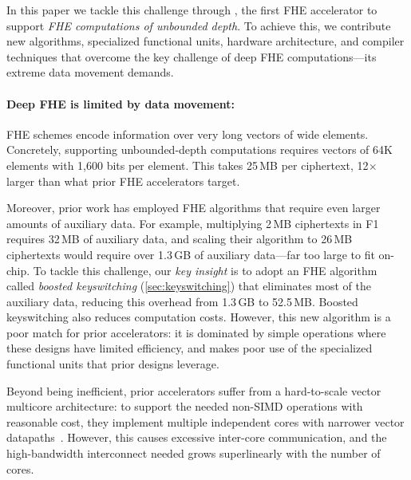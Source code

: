 In this paper we tackle this challenge through \name, the first FHE accelerator
to support \emph{FHE computations of unbounded depth}. To achieve this, we
contribute new algorithms, specialized functional units, hardware architecture,
and compiler techniques that overcome the key challenge of deep FHE
computations---its extreme data movement demands.

\paragraph{Deep FHE is limited by data movement:}
FHE schemes encode information over very long vectors of wide elements.
Concretely, supporting unbounded-depth computations requires vectors of 64K
elements with 1,600 bits per element. This takes 25\,MB per ciphertext,
12$\times$ larger than what prior FHE accelerators target.

Moreover, prior work has employed FHE algorithms that require even larger
amounts of auxiliary data. For example, multiplying 2\,MB ciphertexts in
F1~\cite{feldmann:micro21:f1} requires 32\,MB of auxiliary data, and scaling
their algorithm to 26\,MB ciphertexts would require over 1.3\,GB of auxiliary
data---far too large to fit on-chip. To tackle this challenge, our \emph{key
insight} is to adopt an FHE algorithm called \emph{boosted keyswitching}
(\autoref{sec:keyswitching}) that eliminates most of the auxiliary data,
reducing this overhead from 1.3\,GB to 52.5\,MB. Boosted keyswitching also
reduces computation costs. However, this new algorithm is a poor match for
prior accelerators: it is dominated by simple operations where these designs
have limited efficiency, and makes poor use of the specialized functional units
that prior designs leverage.

Beyond being inefficient, prior accelerators suffer from a hard-to-scale vector
multicore architecture: to support the needed non-SIMD operations with
reasonable cost, they implement multiple independent cores with narrower vector
datapaths~\cite{feldmann:micro21:f1}. However, this causes excessive inter-core
communication, and the high-bandwidth interconnect needed grows superlinearly
with the number of cores.

